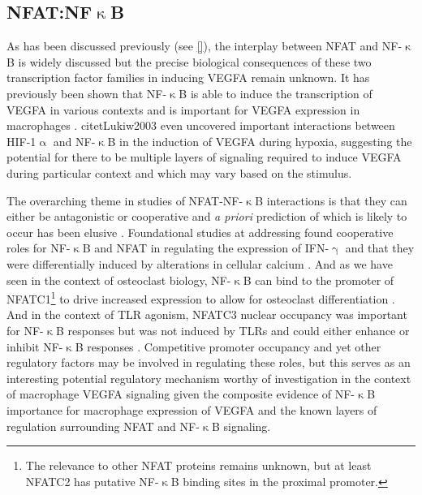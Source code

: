 \subsection{NFAT:NF$\upkappa$B}


As has been discussed previously (see \autoref{}), the interplay between NFAT and NF-$\upkappa$B is widely discussed but the precise biological consequences of these two transcription factor families in inducing VEGFA remain unknown. It has previously been shown that NF-$\upkappa$B is able to induce the transcription of VEGFA in various contexts \citep{Xie2010, Greenberger2010, Lukiw2003} and is important for VEGFA expression in macrophages \citep{Kiriakidis2003}. citet{Lukiw2003} even uncovered important interactions between HIF-1$\upalpha$ and NF-$\upkappa$B in the induction of VEGFA during hypoxia, suggesting the potential for there to be multiple layers of signaling required to induce VEGFA during particular context and which may vary based on the stimulus.

The overarching theme in studies of NFAT-NF-$\upkappa$B interactions is that they can either be antagonistic or cooperative and \textit{a priori} prediction of which is likely to occur has been elusive \citep{Khalaf2013}. Foundational studies at addressing found cooperative roles for NF-$\upkappa$B and NFAT in regulating the expression of IFN-$\upgamma$ \citep{Sica1997} and that they were differentially induced by alterations in cellular calcium \citep{Dolmetsch1997}. And as we have seen in the context of osteoclast biology, NF-$\upkappa$B can bind to the promoter of NFATC1\footnote{The relevance to other NFAT proteins remains unknown, but at least NFATC2 has putative NF-$\upkappa$B binding sites in the proximal promoter.} to drive increased expression to allow for osteoclast differentiation \citep{Asagiri2005}. And in the context of TLR agonism, NFATC3 nuclear occupancy was important for NF-$\upkappa$B responses but was not induced by TLRs and could either enhance or inhibit NF-$\upkappa$B responses \citep{Minematsu2011, Conboy1999}. Competitive promoter occupancy and yet other regulatory factors may be involved in regulating these roles, but this serves as an interesting potential regulatory mechanism worthy of investigation in the context of macrophage VEGFA signaling given the composite evidence of NF-$\upkappa$B importance for macrophage expression of VEGFA and the known layers of regulation surrounding NFAT and NF-$\upkappa$B signaling.

